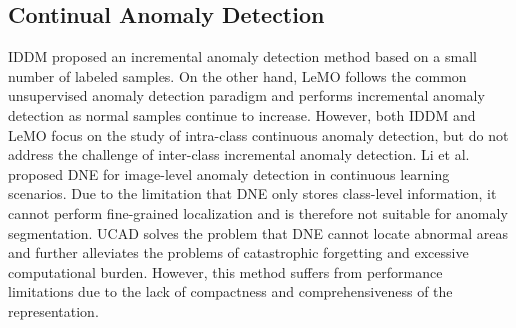 
\subsection{Continual Anomaly Detection}
IDDM \cite{zhang2023iddm} proposed an incremental anomaly detection method based on a small number of labeled samples. On the other hand, LeMO \cite{li2023cross} follows the common unsupervised anomaly detection paradigm and performs incremental anomaly detection as normal samples continue to increase. However, both IDDM and LeMO focus on the study of intra-class continuous anomaly detection, but do not address the challenge of inter-class incremental anomaly detection. Li et al. \cite{li2022towards} proposed DNE for image-level anomaly detection in continuous learning scenarios. Due to the limitation that DNE only stores class-level information, it cannot perform fine-grained localization and is therefore not suitable for anomaly segmentation. UCAD solves the problem that DNE cannot locate abnormal areas and further alleviates the problems of catastrophic forgetting and excessive computational burden. However, this method suffers from performance limitations due to the lack of compactness and comprehensiveness of the representation.

